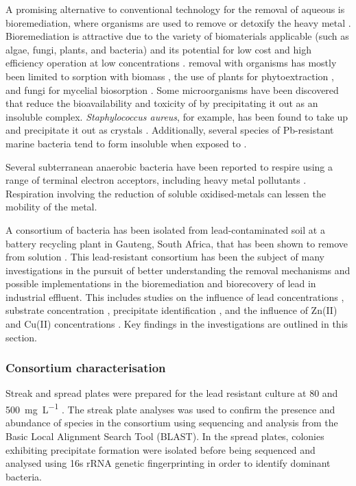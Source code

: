 A promising alternative to conventional technology for the removal of aqueous  is bioremediation, where organisms are used to remove or detoxify the heavy metal \parencite{Philp2005}. Bioremediation is attractive due to the variety of biomaterials applicable (such as algae, fungi, plants, and bacteria) and its potential for low cost and high efficiency operation at low  concentrations \parencite{Kang2015}.  removal with organisms has mostly been limited to sorption with biomass \parencite{Chatterjee2012}, the use of plants for phytoextraction \parencite{Shakoor2013}, and fungi for mycelial biosorption \parencite{Chakraborty2013}. Some microorganisms have been discovered that reduce the bioavailability and toxicity of  by precipitating it out as an insoluble complex. \textit{Staphylococcus aureus}, for example, has been found to take up  and precipitate it out as   crystals \parencite{Levinson1996,Naik2013}. Additionally, several species of Pb-resistant marine bacteria tend to form insoluble  \parencite{De2008} when exposed to . 

Several subterranean anaerobic bacteria have been reported to respire using a range of terminal electron acceptors, including heavy metal pollutants \parencite{Haas2001}. Respiration involving the reduction of soluble oxidised-metals can lessen the mobility of the metal.

A consortium of bacteria has been isolated from lead-contaminated soil at a battery recycling plant in Gauteng, South Africa, that has been shown to remove  from solution \parencite{Brink2017}. This lead-resistant consortium has been the subject of many investigations in the pursuit of better understanding the removal mechanisms and possible implementations in the bioremediation and biorecovery of lead in industrial effluent. This includes studies on the influence of lead concentrations \parencite{Brink2017,Peens2018d}, substrate concentration \parencite{Brink2017,Brink2018}, precipitate identification \parencite{Brink2019a,Peens2018}, and the influence of Zn(II) and Cu(II) concentrations \parencite{Horstmann2020}. Key findings in the investigations are outlined in this section.  

\subsubsection{Consortium characterisation}

Streak and spread plates were prepared for the lead resistant culture at 80 and \SI{500}{\milli\gram\per\liter} . The streak plate analyses was used to confirm the presence and abundance of species in the consortium using sequencing and analysis from the Basic Local Alignment Search Tool (BLAST). In the spread plates, colonies exhibiting precipitate formation were isolated before being sequenced and analysed using 16s rRNA genetic fingerprinting in order to identify dominant bacteria. 


